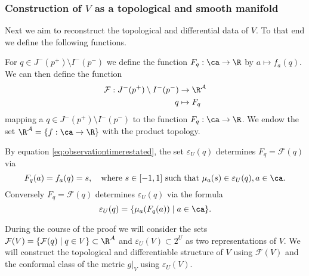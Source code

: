 \subsubsection{Construction of $V$ as a topological and smooth manifold}
Next we aim to reconstruct the topological and differential data of $V$. To that end we define the following functions.

For $q\in J^-(p^+)\setminus I^-(p^-)$ we define the function $F_q:\ca\to\R$ by $a\mapsto f_a(q)$. We can then define the function 
\begin{align*}
    \mathcal{F}:J^-(p^+)\setminus I^-(p^-) &\to \R^\mathcal{A}\\
    q&\mapsto F_q
\end{align*} mapping a $q\in J^-(p^+)\setminus I^-(p^-)$ to the function $F_q:\ca\to\R$. We endow the set $\R^\mathcal{A} = \{f:\ca\to \R\}$ with the product topology.

By equation \ref{eq:observationtimerestated}, the set $\varepsilon_U(q)$ determines $F_q=\mathcal{F}(q)$ via
\begin{equation}\label{eq:epsdetfq}
    F_q(a) = f_a(q) = s,\quad \text{where $s\in [-1,1]$ such that $\mu_a(s)\in \varepsilon_U(q), a\in \ca$}.
\end{equation}
Conversely $F_q=\mathcal{F}(q)$ determines $\varepsilon_U(q)$ via the formula
\begin{equation}\label{eq:fqdeteps}
    \varepsilon_U(q) = \{\mu_a(F_q(a)) \mid a\in \ca\}.
\end{equation}

During the course of the proof we will consider the sets $\mathcal{F}(V) = \{\mathcal{F}(q) \mid q\in V\}\subset \R^\mathcal{A}$ and $\varepsilon_U(V)\subset 2^U$ as two representations of $V$. We will construct the topological and differentiable structure of $V$ using $\mathcal{F}(V)$ and the conformal class of the metric $g\rvert_V$ using $\varepsilon_U(V)$.

